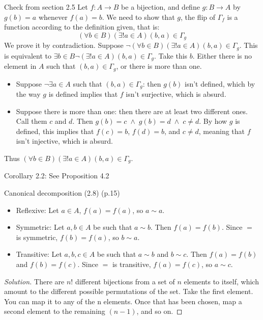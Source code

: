 \documentclass{article}
\theoremstyle{definition}
\newcommand{\AND}{\;\wedge\;}
\theoremstyle{definition}
\newenvironment{solution}{%
  \begin{proof}[Solution]
  \vspace{-8px}
  \setlength{\parskip}{4px}
  \setlength{\parindent}{0px}
}{
  \end{proof}
}
\begin{document}
Check from section 2.5
Let $f \colon A \to B$ be a bijection, and define $g \colon B \to A$ by $g(b) = a$ whenever $f(a) = b$. We need to show that $g$, the flip of $\Gamma_f$ is a function according to the definition given, that is: 
\[ (\forall b \in B)(\exists! a \in A) (b,a) \in \Gamma_g \]
We prove it by contradiction. Suppose $\neg (\forall b \in B)(\exists! a \in A) (b,a) \in \Gamma_g$. This is equivalent to $\exists b \in B \neg (\exists! a \in A) (b,a) \in \Gamma_g$. Take this $b$. Either there is no element in $A$ such that $(b,a) \in \Gamma_g$, or there is more than one.
\begin{itemize}
\item Suppose $\neg \exists a \in A$ such that $(b,a) \in \Gamma_g$: then
$g(b)$ isn't defined, which by the way $g$ is defined implies that $f$ isn't
surjective, which is absurd.
\item Suppose there is more than one: then there are at least two different ones. Call them $c$ and $d$. Then $g(b) = c \AND g(b) = d \AND c \neq d$. By how $g$ is defined, this implies that $f(c) = b$, $f(d) = b$, and $c \neq d$, meaning that $f$ isn't injective, which is absurd.
\end{itemize}
Thus $(\forall b \in B)(\exists! a \in A) (b,a) \in \Gamma_g$.

Corollary 2.2: See Proposition 4.2

Canonical decomposition (2.8) (p.15)
\begin{itemize}
\item Reflexive: Let $a \in A$, $f(a) = f(a)$, so $a \sim a$.
\item Symmetric: Let $a, b \in A$ be such that $a \sim b$. Then $f(a) = f(b)$. Since $=$ is symmetric, $f(b) = f(a)$, so $b \sim a$.
\item Transitive: Let $a, b, c \in A$ be such that $a \sim b$ and $b \sim c$. Then $f(a) = f(b)$ and $f(b) = f(c)$. Since $=$ is transitive, $f(a) = f(c)$, so $a \sim c$.
\end{itemize}

\begin{solution}
There are $n!$ different bijections from a set of $n$ elements to itself, which
amount to the different possible permutations of the set. Take the first
element. You can map it to any of the n elements. Once that has been chosen,
map a second element to the remaining $(n-1)$, and so on.
\end{solution}
\end{document}
